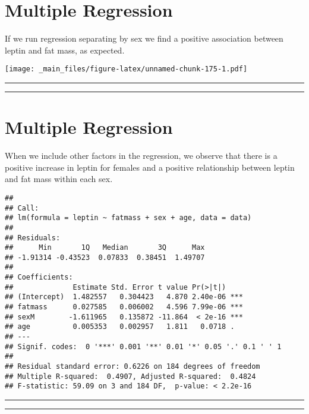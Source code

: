 \documentclass[
]{book}
\begin{document}
\hypertarget{multiple-regression-3}{%
\section{Multiple Regression}\label{multiple-regression-3}}

If we run regression separating by sex we find a positive association between leptin and fat mass, as expected.

\texttt{[image: \_main\_files/figure-latex/unnamed-chunk-175-1.pdf]}

\begin{center}\rule{0.5\linewidth}{0.5pt}\end{center}

\begin{center}\rule{0.5\linewidth}{0.5pt}\end{center}

\hypertarget{multiple-regression-4}{%
\section{Multiple Regression}\label{multiple-regression-4}}

When we include other factors in the regression, we observe that there is a positive increase in leptin for females and a positive relationship between leptin and fat mass within each sex.

\begin{verbatim}
## 
## Call:
## lm(formula = leptin ~ fatmass + sex + age, data = data)
## 
## Residuals:
##      Min       1Q   Median       3Q      Max 
## -1.91314 -0.43523  0.07833  0.38451  1.49707 
## 
## Coefficients:
##              Estimate Std. Error t value Pr(>|t|)    
## (Intercept)  1.482557   0.304423   4.870 2.40e-06 ***
## fatmass      0.027585   0.006002   4.596 7.99e-06 ***
## sexM        -1.611965   0.135872 -11.864  < 2e-16 ***
## age          0.005353   0.002957   1.811   0.0718 .  
## ---
## Signif. codes:  0 '***' 0.001 '**' 0.01 '*' 0.05 '.' 0.1 ' ' 1
## 
## Residual standard error: 0.6226 on 184 degrees of freedom
## Multiple R-squared:  0.4907, Adjusted R-squared:  0.4824 
## F-statistic: 59.09 on 3 and 184 DF,  p-value: < 2.2e-16
\end{verbatim}

\begin{center}\rule{0.5\linewidth}{0.5pt}\end{center}

\begin{center}\rule{0.5\linewidth}{0.5pt}\end{center}
\end{document}
